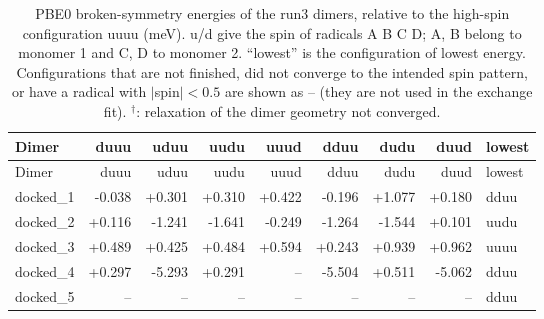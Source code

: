 
\begin{longtable}{@{}lrrrrrrrl@{}}
\caption{PBE0 broken-symmetry energies of the run3 dimers, relative to the high-spin
         configuration uuuu (meV). u/d give the spin of radicals A B C D; A, B belong to monomer 1 and
         C, D to monomer 2. ``lowest'' is the configuration of lowest energy. Configurations that are not
         finished, did not converge to the intended spin pattern, or have a radical with $|$spin$|<0.5$ are
         shown as -- (they are not used in the exchange fit).
         $^{\dagger}$: relaxation of the dimer geometry not converged.}\label{tab:run3_bs_energies}\\
\toprule
Dimer & duuu & uduu & uudu & uuud & dduu & dudu & duud & lowest \\
\midrule
\endfirsthead
\toprule
Dimer & duuu & uduu & uudu & uuud & dduu & dudu & duud & lowest \\
\midrule
\endhead
\bottomrule
\endlastfoot
docked\_1 & -0.038 & +0.301 & +0.310 & +0.422 & -0.196 & +1.077 & +0.180 & dduu \\
docked\_2 & +0.116 & -1.241 & -1.641 & -0.249 & -1.264 & -1.544 & +0.101 & uudu \\
docked\_3 & +0.489 & +0.425 & +0.484 & +0.594 & +0.243 & +0.939 & +0.962 & uuuu \\
docked\_4 & +0.297 & -5.293 & +0.291 & -- & -5.504 & +0.511 & -5.062 & dduu \\
docked\_5 & -- & -- & -- & -- & -- & -- & -- & dduu \\
\end{longtable}
